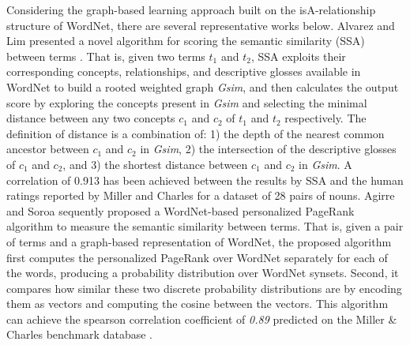 Considering the graph-based learning approach built on the isA-relationship structure of WordNet, there are several representative works below. Alvarez and Lim presented a novel algorithm for scoring the semantic similarity (SSA)
between terms \cite{Alvarez:2007}. That is, given two terms $t_1$ and $t_2$, SSA exploits
their corresponding concepts, relationships, and descriptive glosses available in WordNet to build a
rooted weighted graph \emph{Gsim}, and then calculates the output score by exploring the concepts present in \emph{Gsim} and selecting
the minimal distance between any two concepts $c_1$ and $c_2$ of $t_1$ and $t_2$ respectively. The definition of distance is
a combination of: 1) the depth of the nearest common ancestor between $c_1$ and $c_2$ in \emph{Gsim}, 2) the intersection of the
descriptive glosses of $c_1$ and $c_2$, and 3) the shortest distance between $c_1$ and $c_2$ in \emph{Gsim}. A correlation of 0.913 has been
achieved between the results by SSA and the human ratings reported by Miller and Charles for a dataset of 28 pairs of nouns. Agirre and Soroa sequently proposed a WordNet-based personalized PageRank algorithm to measure the semantic similarity between terms\cite{Soroa:2009}. That is, given a pair of terms and a graph-based representation of WordNet, the proposed algorithm first computes the personalized PageRank over WordNet separately for each of the words, producing a probability distribution over WordNet synsets. Second, it compares how similar these two discrete probability distributions are by encoding them as vectors and computing the cosine between the vectors.
This algorithm can achieve the spearson correlation coefficient of \emph{0.89} predicted on the Miller \& Charles benchmark database \cite{Miller:1998}.


